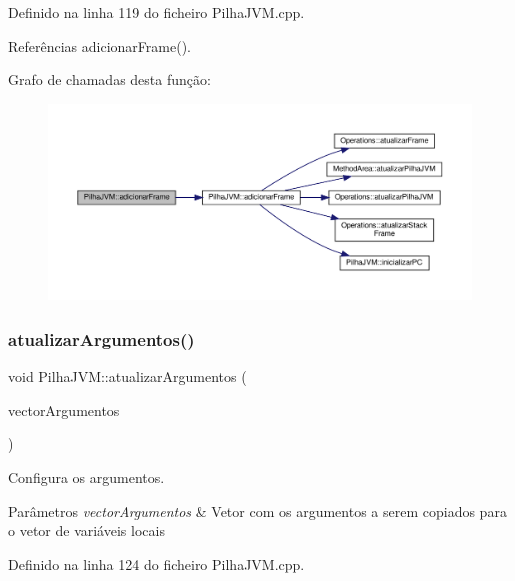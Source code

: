 Definido na linha 119 do ficheiro Pilha\+J\+V\+M.\+cpp.



Referências adicionar\+Frame().

Grafo de chamadas desta função\+:
\nopagebreak
\begin{figure}[H]
\begin{center}
\leavevmode
\includegraphics[width=350pt]{classPilhaJVM_a6a47624a1e9923e59258454e6e6d1271_cgraph}
\end{center}
\end{figure}
\mbox{\label{classPilhaJVM_a43252c128cf31ac202373d6b66868a77}} 
\subsubsection{\texorpdfstring{atualizar\+Argumentos()}{atualizarArgumentos()}}
{\footnotesize\ttfamily void Pilha\+J\+V\+M\+::atualizar\+Argumentos (\begin{DoxyParamCaption}\item[{vector$<$ \hyperlink{BasicTypes_8h_a97b332303b1262282599e6ede0637b82}{Typed\+Element} $>$}]{vector\+Argumentos }\end{DoxyParamCaption})}



Configura os argumentos. 


\begin{DoxyParams}{Parâmetros}
{\em vector\+Argumentos} & Vetor com os argumentos a serem copiados para o vetor de variáveis locais \\
\hline
\end{DoxyParams}


Definido na linha 124 do ficheiro Pilha\+J\+V\+M.\+cpp.



